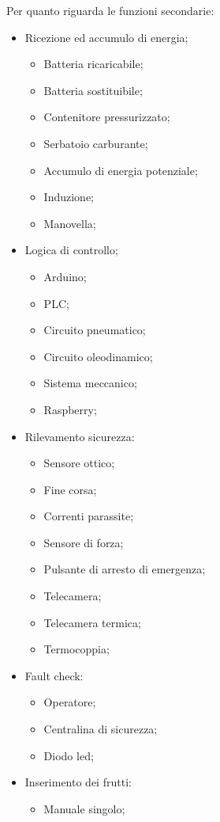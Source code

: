 \documentclass[12pt,a4paper,twoside]{report}  %
\begin{document}
Per quanto riguarda le funzioni secondarie:
\begin{itemize}
\item Ricezione ed accumulo di energia;
  \begin{itemize}
  \item Batteria ricaricabile;
  \item Batteria sostituibile;
  \item Contenitore pressurizzato;
  \item Serbatoio carburante;
  \item Accumulo di energia potenziale;
  \item Induzione;
  \item Manovella;
  \end{itemize}
\item Logica di controllo;
  \begin{itemize}
  \item Arduino;
  \item PLC;
  \item Circuito pneumatico;
  \item Circuito oleodinamico;
  \item Sistema meccanico;
  \item Raspberry;
  \end{itemize}
\item Rilevamento sicurezza:
  \begin{itemize}
  \item Sensore ottico;
  \item Fine corsa;
  \item Correnti parassite;
  \item Sensore di forza;
  \item Pulsante di arresto di emergenza;
  \item Telecamera;
  \item Telecamera termica;
  \item Termocoppia;
  \end{itemize}
\item Fault check:
  \begin{itemize}
  \item Operatore;
  \item Centralina di sicurezza;
  \item Diodo led;
  \end{itemize}
\item Inserimento dei frutti:
  \begin{itemize}
  \item Manuale singolo;

\end{itemize}
\end{itemize}
\end{document}
